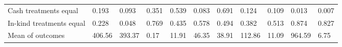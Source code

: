 \begin{table}[H]
{\begin{tabular}{lllllllllll}
\hspace{1em}\hspace{1em} Cash treatments equal & 0.193 & 0.093 & 0.351 & 0.539 & 0.083 & 0.691 & 0.124 & 0.109 & 0.013 & 0.007\\
\hspace{1em}\hspace{1em} In-kind treatments equal & 0.228 & 0.048 & 0.769 & 0.435 & 0.578 & 0.494 & 0.382 & 0.513 & 0.874 & 0.827\\
\hspace{1em}Mean of outcomes & 406.56 & 393.37 & 0.17 & 11.91 & 46.35 & 38.91 & 112.86 & 11.09 & 964.59 & 6.75\\
\bottomrule
\end{tabular}}
\end{table}
